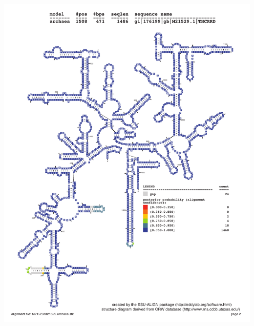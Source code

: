 \documentclass[landscape]{slides}
\begin{document}
\begin{slide}\begin{center}\includegraphics[height=8in]{figs/M21529-archaea-indi}\end{center}\vfill\end{slide}
\end{document}

